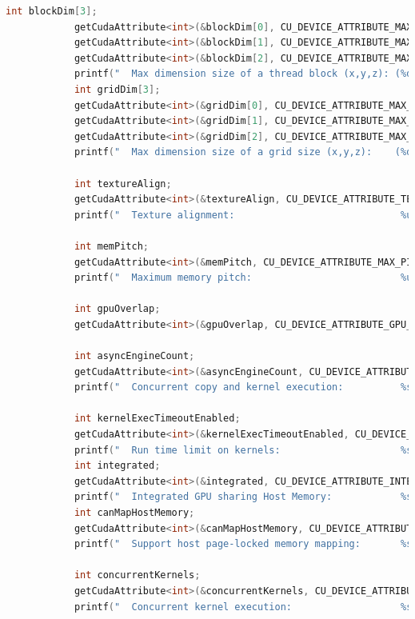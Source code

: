 \documentclass{scrreprt}
\begin{document}
\begin{lstlisting}[language=C++, caption=deviceQueryDrv.h]
			int blockDim[3];
			getCudaAttribute<int>(&blockDim[0], CU_DEVICE_ATTRIBUTE_MAX_BLOCK_DIM_X, dev);
			getCudaAttribute<int>(&blockDim[1], CU_DEVICE_ATTRIBUTE_MAX_BLOCK_DIM_Y, dev);
			getCudaAttribute<int>(&blockDim[2], CU_DEVICE_ATTRIBUTE_MAX_BLOCK_DIM_Z, dev);
			printf("  Max dimension size of a thread block (x,y,z): (%d, %d, %d)\n", blockDim[0], blockDim[1], blockDim[2]);
			int gridDim[3];
			getCudaAttribute<int>(&gridDim[0], CU_DEVICE_ATTRIBUTE_MAX_GRID_DIM_X, dev);
			getCudaAttribute<int>(&gridDim[1], CU_DEVICE_ATTRIBUTE_MAX_GRID_DIM_Y, dev);
			getCudaAttribute<int>(&gridDim[2], CU_DEVICE_ATTRIBUTE_MAX_GRID_DIM_Z, dev);
			printf("  Max dimension size of a grid size (x,y,z):    (%d, %d, %d)\n", gridDim[0], gridDim[1], gridDim[2]);

			int textureAlign;
			getCudaAttribute<int>(&textureAlign, CU_DEVICE_ATTRIBUTE_TEXTURE_ALIGNMENT, dev);
			printf("  Texture alignment:                             %u bytes\n", textureAlign);

			int memPitch;
			getCudaAttribute<int>(&memPitch, CU_DEVICE_ATTRIBUTE_MAX_PITCH, dev);
			printf("  Maximum memory pitch:                          %u bytes\n", memPitch);

			int gpuOverlap;
			getCudaAttribute<int>(&gpuOverlap, CU_DEVICE_ATTRIBUTE_GPU_OVERLAP, dev);

			int asyncEngineCount;
			getCudaAttribute<int>(&asyncEngineCount, CU_DEVICE_ATTRIBUTE_ASYNC_ENGINE_COUNT, dev);
			printf("  Concurrent copy and kernel execution:          %s with %d copy engine(s)\n", (gpuOverlap ? "Yes" : "No"), asyncEngineCount);

			int kernelExecTimeoutEnabled;
			getCudaAttribute<int>(&kernelExecTimeoutEnabled, CU_DEVICE_ATTRIBUTE_KERNEL_EXEC_TIMEOUT, dev);
			printf("  Run time limit on kernels:                     %s\n", kernelExecTimeoutEnabled ? "Yes" : "No");
			int integrated;
			getCudaAttribute<int>(&integrated, CU_DEVICE_ATTRIBUTE_INTEGRATED, dev);
			printf("  Integrated GPU sharing Host Memory:            %s\n", integrated ? "Yes" : "No");
			int canMapHostMemory;
			getCudaAttribute<int>(&canMapHostMemory, CU_DEVICE_ATTRIBUTE_CAN_MAP_HOST_MEMORY, dev);
			printf("  Support host page-locked memory mapping:       %s\n", canMapHostMemory ? "Yes" : "No");

			int concurrentKernels;
			getCudaAttribute<int>(&concurrentKernels, CU_DEVICE_ATTRIBUTE_CONCURRENT_KERNELS, dev);
			printf("  Concurrent kernel execution:                   %s\n", concurrentKernels ? "Yes" : "No");


\end{lstlisting}
\end{document}
